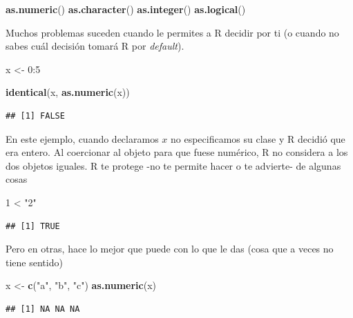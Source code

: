 \documentclass[]{article}
\newenvironment{Shaded}{\begin{snugshade}}{\end{snugshade}}
\newcommand{\KeywordTok}[1]{\textcolor[rgb]{0.13,0.29,0.53}{\textbf{{#1}}}}
\newcommand{\DecValTok}[1]{\textcolor[rgb]{0.00,0.00,0.81}{{#1}}}
\newcommand{\StringTok}[1]{\textcolor[rgb]{0.31,0.60,0.02}{{#1}}}
\newcommand{\NormalTok}[1]{{#1}}
\begin{document}
\begin{Shaded}
\begin{Highlighting}[]
\KeywordTok{as.numeric}\NormalTok{()}
\KeywordTok{as.character}\NormalTok{()}
\KeywordTok{as.integer}\NormalTok{()}
\KeywordTok{as.logical}\NormalTok{()}
\end{Highlighting}
\end{Shaded}

Muchos problemas suceden cuando le permites a R decidir por ti (o cuando
no sabes cuál decisión tomará R por \emph{default}).

\begin{Shaded}
\begin{Highlighting}[]
\NormalTok{x <-}\StringTok{ }\DecValTok{0}\NormalTok{:}\DecValTok{5}

\KeywordTok{identical}\NormalTok{(x, }\KeywordTok{as.numeric}\NormalTok{(x))}
\end{Highlighting}
\end{Shaded}

\begin{verbatim}
## [1] FALSE
\end{verbatim}

En este ejemplo, cuando declaramos \(x\) no especificamos su clase y R
decidió que era entero. Al coercionar al objeto para que fuese numérico,
R no considera a los dos objetos iguales. R te protege -no te permite
hacer o te advierte- de algunas cosas

\begin{Shaded}
\begin{Highlighting}[]
\DecValTok{1} \NormalTok{<}\StringTok{ "2"}
\end{Highlighting}
\end{Shaded}

\begin{verbatim}
## [1] TRUE
\end{verbatim}

Pero en otras, hace lo mejor que puede con lo que le das (cosa que a
veces no tiene sentido)

\begin{Shaded}
\begin{Highlighting}[]
\NormalTok{x <-}\StringTok{ }\KeywordTok{c}\NormalTok{(}\StringTok{"a"}\NormalTok{, }\StringTok{"b"}\NormalTok{, }\StringTok{"c"}\NormalTok{)}
\KeywordTok{as.numeric}\NormalTok{(x)}
\end{Highlighting}
\end{Shaded}

\begin{verbatim}
## [1] NA NA NA
\end{verbatim}
\end{document}
